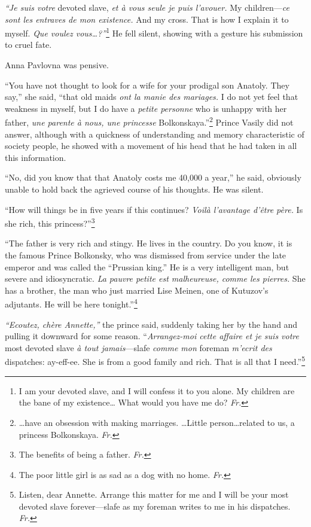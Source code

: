 \textit{``Je suis votre} devoted slave, \textit{et \`a vous seule je
  puis l'avouer.} My children---\textit{ce sont les entraves de mon
  existence.} And my cross. That is how I explain it to
myself. \textit{Que voulez vous\ldots{}?''}\footnote{I am your devoted
  slave, and I will confess it to you alone. My children are the bane
  of my existence\ldots{} What would you have me do? \textit{Fr.}} He
fell silent, showing with a gesture his submission to cruel fate.

Anna Pavlovna was pensive.

``You have not thought to look for a wife for your prodigal son
Anatoly. They say,'' she said, ``that old maids \textit{ont la manie
  des mariages.} I do not yet feel that weakness in myself, but I do
have a \textit{petite personne} who is unhappy with her father,
\textit{une parente \`a nous, une princesse}
Bolkonskaya.''\footnote{\ldots{}have an obsession with making
  marriages. \ldots{}Little person\ldots{}related to us, a princess
  Bolkonskaya. \textit{Fr.}} Prince Vasily did not answer, although
with a quickness of understanding and memory characteristic of society
people, he showed with a movement of his head that he had taken in all
this information. %

``No, did you know that that Anatoly costs me 40,000 a year,'' he
said, obviously unable to hold back the agrieved course of his
thoughts. He was silent. %

``How will things be in five years if this continues? \textit{Voil\`a
  l'avantage d'\^etre p\`ere.} Is she rich, this
princess?''\footnote{The benefits of being a father. \textit{Fr.}}

``The father is very rich and stingy. He lives in the country. Do you
know, it is the famous Prince Bolkonsky, who was dismissed from
service under the late emperor and was called the ``Prussian king.''
He is a very intelligent man, but severe and idiosyncratic. \textit{La
  pauvre petite est malheureuse, comme les pierres.} She has a
brother, the man who just married Lise Meinen, one of Kutuzov's
adjutants. He will be here tonight.''\footnote{The poor little girl is
  as sad as a dog with no home. \textit{Fr.}} %

\textit{``Ecoutez, ch\`ere Annette,''} the prince said, suddenly
taking her by the hand and pulling it downward for some
reason. ``\textit{Arrangez-moi cette affaire et je suis votre} most
devoted slave \textit{\`a tout jamais}---slafe \textit{comme mon}
foreman \textit{m'ecrit des} dispatches: ay-eff-ee. She is from a good
family and rich. That is all that I need.''\footnote{Listen, dear
  Annette. Arrange this matter for me and I will be your most devoted
  slave forever---slafe as my foreman writes to me in his
  dispatches. \textit{Fr.}} %

